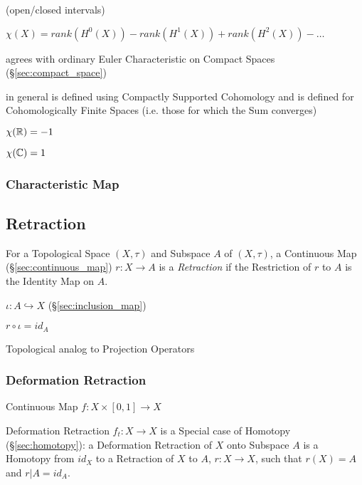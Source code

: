 (open/closed intervals) %

$\chi(X) = rank (H^0(X)) - rank (H^1(X)) + rank (H^2(X)) - \ldots$

agrees with ordinary Euler Characteristic on Compact Spaces
(\S\ref{sec:compact_space})

in general is defined using Compactly Supported Cohomology and is
defined for Cohomologically Finite Spaces (i.e. those for which the
Sum converges) %

$\chi(\mathbb{R}) = -1$

$\chi(\mathbb{C}) = 1$



\subsubsection{Characteristic Map}\label{sec:characteristic_map}




\subsection{Retraction}\label{sec:subspace_retraction}

For a Topological Space $(X, \tau)$ and Subspace $A$ of $(X,\tau)$, a
Continuous Map (\S\ref{sec:continuous_map}) $r : X \rightarrow A$ is a
\emph{Retraction} if the Restriction of $r$ to $A$ is the Identity Map
on $A$.

$\iota : A \hookrightarrow X$ (\S\ref{sec:inclusion_map})

$r \circ \iota = id_A$

Topological analog to Projection Operators %
\cite{hatcher02}



\subsubsection{Deformation Retraction}\label{sec:deformation_retraction}

Continuous Map $f : X \times [0,1] \rightarrow X$

Deformation Retraction $f_t : X \rightarrow X$ is a Special case of
Homotopy (\S\ref{sec:homotopy}): a Deformation Retraction of $X$ onto
Subspace $A$ is a Homotopy from $id_X$ to a Retraction of $X$ to $A$,
$r : X \rightarrow X$, such that $r(X) = A$ and $r | A = id_A$.
\cite{hatcher02}




